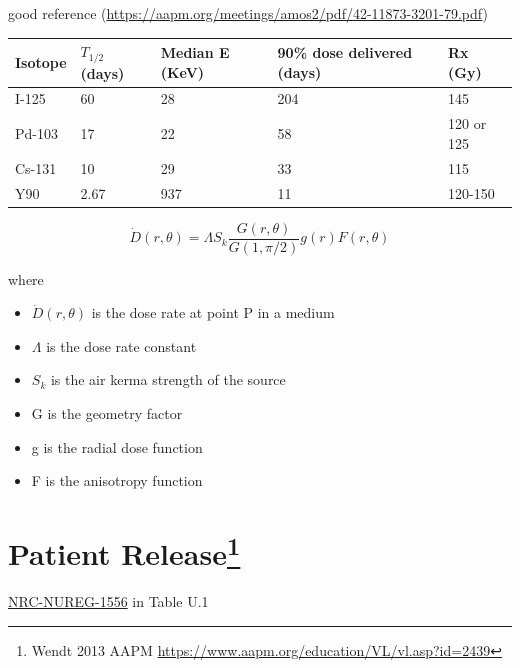 \documentclass[]{book}
\providecommand{\tightlist}{%
  \setlength{\itemsep}{0pt}\setlength{\parskip}{0pt}}
\let\rmarkdownfootnote\footnote%
\def\footnote{\protect\rmarkdownfootnote}
\theoremstyle{definition}
\theoremstyle{definition}
\theoremstyle{definition}
\theoremstyle{remark}
\begin{document}
good reference
(\url{https://aapm.org/meetings/amos2/pdf/42-11873-3201-79.pdf})

\begin{longtable}[]{@{}lllll@{}}
\toprule
Isotope & \(T_{1/2}\) (days) & Median E (KeV) & 90\% dose delivered
(days) & Rx (Gy)\tabularnewline
\midrule
\endhead
I-125 & 60 & 28 & 204 & 145\tabularnewline
Pd-103 & 17 & 22 & 58 & 120 or 125\tabularnewline
Cs-131 & 10 & 29 & 33 & 115\tabularnewline
Y90 & 2.67 & 937 & 11 & 120-150\tabularnewline
\bottomrule
\end{longtable}

\begin{equation}
  \dot D(r, \theta) = \Lambda S_k \frac{G(r,\theta)}{G(1,\pi/2)} g(r) F(r,\theta)
\end{equation}

where

\begin{itemize}
\tightlist
\item
  \(\dot D(r,\theta)\) is the dose rate at point P in a medium
\item
  \(\Lambda\) is the dose rate constant
\item
  \(S_k\) is the air kerma strength of the source
\item
  G is the geometry factor
\item
  g is the radial dose function
\item
  F is the anisotropy function
\end{itemize}

\section[Patient Release]{\texorpdfstring{Patient Release\footnote{Wendt
  2013 AAPM \url{https://www.aapm.org/education/VL/vl.asp?id=2439}}}{Patient Release}}\label{patient-release}

\href{https://www.nrc.gov/reading-rm/doc-collections/nuregs/staff/sr1556/}{NRC-NUREG-1556}
in Table U.1
\end{document}

